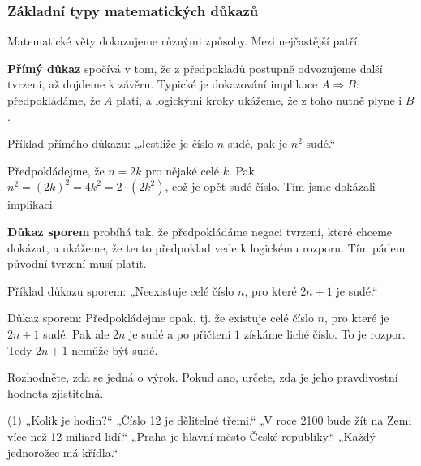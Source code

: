 \documentclass[12pt,a4paper]{article}
\begin{document}
\subsubsection*{Základní typy matematických důkazů}

Matematické věty dokazujeme různými způsoby. Mezi nejčastější patří:

\begin{definitionbox}
\textbf{Přímý důkaz} spočívá v tom, že z předpokladů postupně odvozujeme další tvrzení, až dojdeme k závěru.  
Typické je dokazování implikace $A \Rightarrow B$: předpokládáme, že $A$ platí, a logickými kroky ukážeme, že z toho nutně plyne i $B$.
\end{definitionbox}

\begin{examplebox}
Příklad přímého důkazu:  
„Jestliže je číslo $n$ sudé, pak je $n^2$ sudé.“  

Předpokládejme, že $n = 2k$ pro nějaké celé $k$. Pak $n^2 = (2k)^2 = 4k^2 = 2 \cdot (2k^2)$, což je opět sudé číslo.  
Tím jsme dokázali implikaci.
\end{examplebox}

\begin{definitionbox}
\textbf{Důkaz sporem} probíhá tak, že předpokládáme negaci tvrzení, které chceme dokázat, a ukážeme, že tento předpoklad vede k logickému rozporu.  
Tím pádem původní tvrzení musí platit.
\end{definitionbox}

\begin{examplebox}
Příklad důkazu sporem:  
„Neexistuje celé číslo $n$, pro které $2n+1$ je sudé.“  

Důkaz sporem: Předpokládejme opak, tj. že existuje celé číslo $n$, pro které je $2n+1$ sudé.  
Pak ale $2n$ je sudé a po přičtení $1$ získáme liché číslo. To je rozpor.  
Tedy $2n+1$ nemůže být sudé.
\end{examplebox}



\exercisepart

\begin{exercise}
Rozhodněte, zda se jedná o výrok. Pokud ano, určete, zda je jeho pravdivostní hodnota zjistitelná.
\begin{tasks}(1)
\task „Kolik je hodin?“  
\task „Číslo 12 je dělitelné třemi.“  
\task „V roce 2100 bude žít na Zemi více než 12 miliard lidí.“  
\task „Praha je hlavní město České republiky.“  
\task „Každý jednorožec má křídla.“  
\end{tasks}
\end{exercise}
\end{document}
